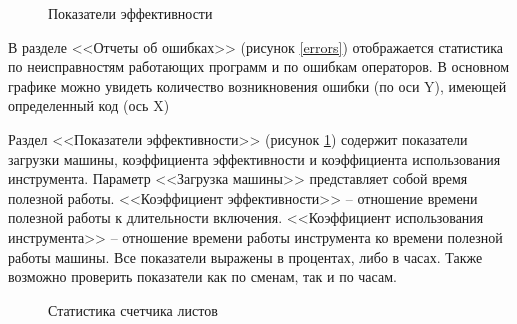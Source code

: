 \begin{figure}[ht!]
    \caption{Показатели эффективности}
    \label{effective}
\end{figure}

В разделе <<Отчеты об ошибках>> (рисунок \ref{errors}) отображается статистика
по неисправностям работающих программ и по ошибкам операторов.
В основном графике можно увидеть количество возникновения
ошибки (по оси Y), имеющей определенный код (ось X)

Раздел <<Показатели эффективности>> (рисунок \ref{effective}) содержит показатели
загрузки машины, коэффициента эффективности
и коэффициента использования инструмента.
Параметр <<Загрузка машины>> представляет собой
время полезной работы.
<<Коэффициент эффективности>> -- отношение времени полезной работы
к длительности включения.
<<Коэффициент использования инструмента>> -- отношение времени работы
инструмента ко времени полезной работы машины.
Все показатели выражены в процентах, либо в часах.
Также возможно проверить показатели как по сменам,
так и по часам.

\begin{figure}[ht!]
    \caption{Статистика счетчика листов}
    \label{counter}
\end{figure}


